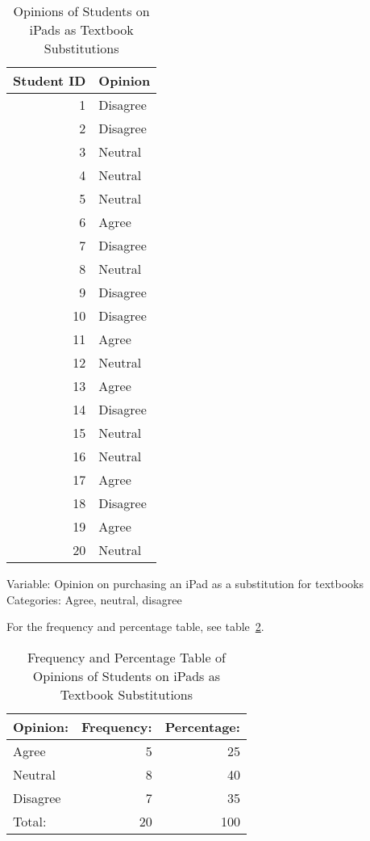 \begin{easylist}
		\Deactivate
		\begin{table}[!htb]
			\centering
			\caption{Opinions of Students on iPads as Textbook Substitutions}
			\label{tab:ipad-textbook-replacement}
			\begin{tabular}{ r l }
				Student ID & Opinion \\
				\hline
				 1 & Disagree \\
				 2 & Disagree \\
				 3 & Neutral \\
				 4 & Neutral \\
				 5 & Neutral \\
				 6 & Agree \\
				 7 & Disagree \\
				 8 & Neutral \\
				 9 & Disagree \\
				10 & Disagree \\
				11 & Agree \\
				12 & Neutral \\
				13 & Agree \\
				14 & Disagree \\
				15 & Neutral \\
				16 & Neutral \\
				17 & Agree \\
				18 & Disagree \\
				19 & Agree \\
				20 & Neutral
			\end{tabular}
		\end{table}
		\Activate
		
		\smallskip
		Variable: Opinion on purchasing an iPad as a substitution for textbooks \\
		Categories: Agree, neutral, disagree
		
		\smallskip
		For the frequency and percentage table, see table~\ref{tab:ipad-textbook-replacement-freq-table}.
			
		\Deactivate
		\begin{table}[!htb]
			\centering
			\caption{Frequency and Percentage Table of Opinions of Students on iPads as Textbook Substitutions}
			\label{tab:ipad-textbook-replacement-freq-table}
			\begin{tabular}{ l r r }
				Opinion:	& Frequency:	& Percentage: \\
				\hline
				Agree		& 5 			& 25 \\
				Neutral		& 8 			& 40 \\
				Disagree	& 7 			& 35 \\
				\hline
				Total:		& 20			& 100
			\end{tabular}
		\end{table}
		\Activate
		

\end{easylist}
